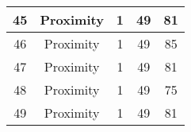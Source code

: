 \documentclass[results.tex]{subfiles}
\begin{document}
\begin{center}
\begin{tabular}{| c || c | c | c | c |}
            \hline
            45                      & Proximity                    & 1                      & 49                      & 81                   \\
            \hline
            46                      & Proximity                    & 1                      & 49                      & 85                   \\
            \hline
            47                      & Proximity                    & 1                      & 49                      & 81                   \\
            \hline
            48                      & Proximity                    & 1                      & 49                      & 75                   \\
            \hline
            49                      & Proximity                    & 1                      & 49                      & 81                   \\
            \hline
        \end{tabular}
    \end{center}
\end{document}

